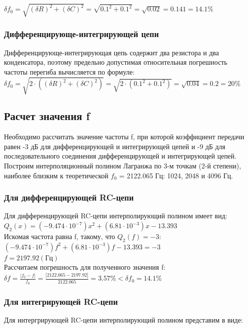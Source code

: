 $\delta f_0 = \sqrt{(\delta R)^2 + (\delta C)^2} = \sqrt{0.1^2 + 0.1^2} = \sqrt{0.02} = 0.141 = 14.1 \%$\\

\subsubsection{Дифференцирующе-интегрирующей цепи}

Дифференцирующе-интегрирующая цепь содержит два резистора и два конденсатора, поэтому предельно допустимая относительная погрешность частоты перегиба вычисляется по формуле:\\

$\delta f_0 = \sqrt{2 \cdot ((\delta R)^2 + (\delta C)^2)} = \sqrt{2 \cdot (0.1^2 + 0.1^2)} = \sqrt{0.04} = 0.2 = 20 \%$


\subsection{Расчет значения f}
  Необходимо рассчитать значение частоты f, при которой коэффициент передачи равен -3 дБ для дифференцирующей и интегрирующей цепей и -9 дБ для последовательного соединения дифференцирующей и интегрирующей цепей. Построим интерполяционный полином Лагранжа по 3-м точкам (2-й степени), наиболее близким к теоретической $f_0$ = 2122.065 Гц: 1024, 2048 и 4096 Гц.
\subsubsection{Для дифференцирующей RC-цепи}

Для дифференцирующей RC-цепи интерполирующий полином имеет вид:\\

$Q_2(x) = (-9.474 \cdot 10^{-7})x^2 + (6.81 \cdot 10^{-3})x -13.393$\\

Искомая частота равна f, такому, что $Q_2(f) = -3$:\\

$(-9.474 \cdot 10^{-7})f^2 + (6.81 \cdot 10^{-3})f -13.393 = -3$\\
$f = 2197.92 (\text{Гц})$\\

Рассчитаем погрешность для полученного значения f:\\

$\delta f = \frac{|f_0 - f|}{f_0} = \frac{|2122.065 - 2197.92|}{2122.065} = 3.57 \% < \delta f_0 = 14.1\%$

\subsubsection{Для интегрирующей RC-цепи}
Для интергрирующей RC-цепи интерполирующий полином представим в виде:\\


